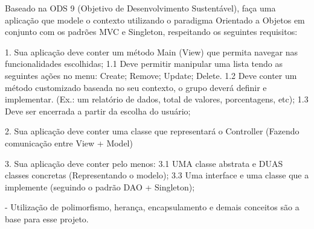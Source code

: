 Baseado na ODS 9 (Objetivo de Desenvolvimento Sustentável), faça uma aplicação que modele o contexto utilizando o paradigma Orientado a Objetos em conjunto com os padrões MVC e Singleton, respeitando os seguintes requisitos:

1. Sua aplicação deve conter um método Main (View) que permita navegar nas funcionalidades escolhidas;
1.1 Deve permitir manipular uma lista tendo as seguintes ações no menu: Create; Remove; Update; Delete.
1.2 Deve conter um método customizado baseada no seu contexto, o grupo deverá definir e implementar. (Ex.: um relatório de dados, total de valores, porcentagens, etc);
1.3 Deve ser encerrada a partir da escolha do usuário;

2. Sua aplicação deve conter uma classe que representará o Controller (Fazendo comunicação entre View + Model)

3. Sua aplicação deve conter pelo menos:
3.1 UMA classe abstrata e DUAS classes concretas (Representando o modelo);
3.3 Uma interface e uma classe que a implemente (seguindo o padrão DAO + Singleton);

- Utilização de polimorfismo, herança, encapsulamento e demais conceitos são a base para esse projeto.
